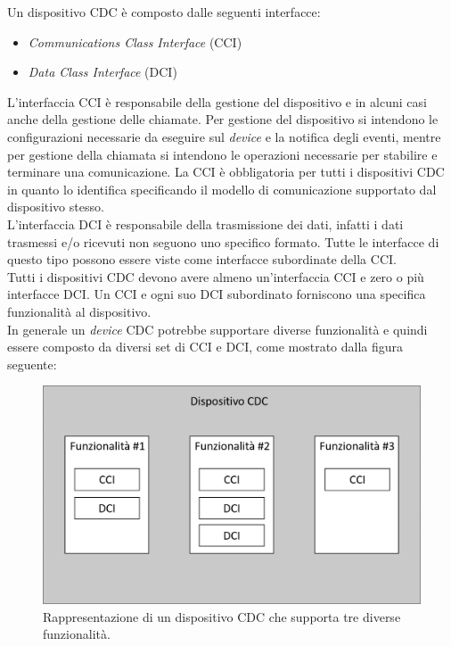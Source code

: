 Un dispositivo CDC è composto \cite{usbCDC2} dalle seguenti interfacce:
\begin{itemize}
	\item \textit{Communications Class Interface} (CCI)
	\item \textit{Data Class Interface} (DCI)
\end{itemize}
L'interfaccia CCI è responsabile della gestione del dispositivo e in alcuni casi anche della gestione delle chiamate. Per gestione del dispositivo si intendono le configurazioni necessarie da eseguire sul \textit{device} e la notifica degli eventi, mentre per gestione della chiamata si intendono le operazioni necessarie per stabilire e terminare una comunicazione. La CCI è obbligatoria per tutti i dispositivi CDC in quanto lo identifica specificando il modello di comunicazione supportato dal dispositivo stesso.\\
L'interfaccia DCI è responsabile della trasmissione dei dati, infatti i dati trasmessi e/o ricevuti non seguono uno specifico formato. Tutte le interfacce di questo tipo possono essere viste come interfacce subordinate della CCI.\\
Tutti i dispositivi CDC devono avere almeno un'interfaccia CCI e zero o più interfacce DCI. Un CCI e ogni suo DCI subordinato forniscono una specifica funzionalità al dispositivo.\\
In generale un \textit{device} CDC potrebbe supportare diverse funzionalità e quindi essere composto da diversi set di CCI e DCI, come mostrato dalla figura seguente:
\begin{figure}[H]  
	\centering 
	\includegraphics[scale=0.4]{implementazione/cdcDevice.png}
	\caption{Rappresentazione di un dispositivo CDC che supporta tre diverse funzionalità.}
	\label{fig:cdcDevice}
\end{figure}
